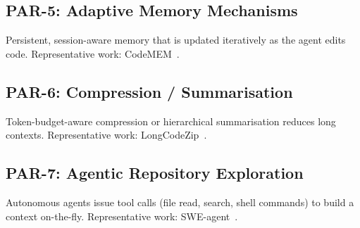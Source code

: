 \subsection{PAR-5: Adaptive Memory Mechanisms}
Persistent, session-aware memory that is updated iteratively as the agent
edits code.  Representative work: CodeMEM~\cite{wang2026codemem}.

\subsection{PAR-6: Compression / Summarisation}
Token-budget-aware compression or hierarchical summarisation reduces long
contexts.  Representative work: LongCodeZip~\cite{shi2025longcodezip}.

\subsection{PAR-7: Agentic Repository Exploration}
Autonomous agents issue tool calls (file read, search, shell commands) to
build a context on-the-fly.  Representative work:
SWE-agent~\cite{yang2024sweagent}.
